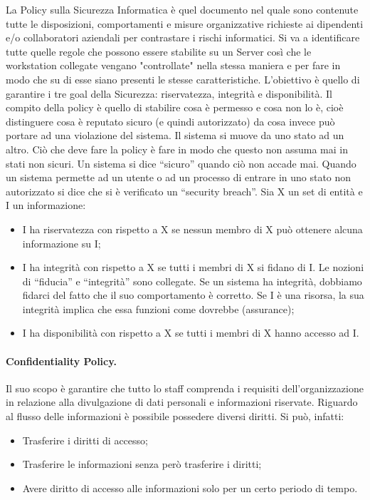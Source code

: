 La Policy sulla Sicurezza Informatica è quel documento nel quale sono
contenute tutte le
disposizioni, comportamenti e misure organizzative richieste ai dipendenti
e/o collaboratori
aziendali per contrastare i rischi informatici. Si va a identificare tutte
quelle regole che possono
essere stabilite su un Server così che le workstation collegate vengano
"controllate" nella stessa
maniera e per fare in modo che su di esse siano presenti le stesse
caratteristiche.
L'obiettivo è quello di garantire i tre goal della Sicurezza:
riservatezza, integrità e disponibilità.
Il compito della policy è quello di stabilire cosa è permesso e cosa non
lo è, cioè distinguere cosa è
reputato sicuro (e quindi autorizzato) da cosa invece può portare ad una
violazione del sistema. Il
sistema si muove da uno stato ad un altro. Ciò che deve fare la policy è
fare in modo che questo
non assuma mai in stati non sicuri. Un sistema si dice “sicuro” quando ciò
non accade mai.
Quando un sistema permette ad un utente o ad un processo di entrare in uno
stato non autorizzato
si dice che si è verificato un “security breach”.
Sia X un set di entità e I un informazione:
\begin{itemize}
      \item I ha riservatezza con rispetto a X se nessun membro di X può
            ottenere alcuna
            informazione su I;
      \item I ha integrità con rispetto a X se tutti i membri di X si fidano
            di I. Le nozioni di “fiducia” e
            “integrità” sono collegate. Se un sistema ha integrità, dobbiamo
            fidarci del fatto che il suo
            comportamento è corretto. Se I è una risorsa, la sua integrità implica
            che essa funzioni
            come dovrebbe (assurance);
      \item I ha disponibilità con rispetto a X se tutti i membri di X hanno
            accesso ad I.
\end{itemize}


\paragraph{Confidentiality Policy.}

Il suo scopo è garantire che tutto lo staff comprenda i requisiti
dell'organizzazione in relazione alla
divulgazione di dati personali e informazioni riservate.
Riguardo al flusso delle informazioni è possibile possedere diversi
diritti. Si può, infatti:
\begin{itemize}
      \item Trasferire i diritti di accesso;
      \item Trasferire le informazioni senza però trasferire i diritti;
      \item Avere diritto di accesso alle informazioni solo per un certo
            periodo di tempo.
\end{itemize}

